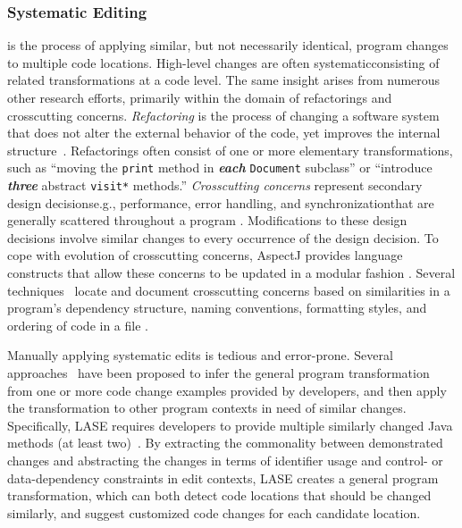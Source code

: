\documentclass[runningheads,a4paper]{llncs}
\newcommand{\codefont}[1]{\footnotesize{\texttt{#1}}\normalsize}
\begin{document}
\subsubsection{Systematic Editing} is the process of applying similar, but not necessarily identical, program changes to multiple code locations. 
High-level changes are often systematic\textemdash consisting of related transformations at a code level. The same insight arises from numerous other research efforts, primarily within the domain of refactorings and crosscutting concerns. {\em Refactoring} is the process of changing a software system that does not alter the external behavior of the code, yet improves the internal structure~\cite{Fowler2000, Griswold1991, Mens2004, Opdyke1992}. Refactorings often consist of one or more elementary transformations, such as ``moving the \codefont{print} method in {\bf \em each} \codefont{Document} subclass'' or ``introduce {\bf \em three} abstract \codefont{visit*} methods.'' {\em Crosscutting concerns} represent secondary design decisions\textemdash e.g., performance, error handling, and synchronization\textemdash that are generally scattered throughout a program \cite{Kiczales1997, Tarr1999}. Modifications to these design decisions involve similar changes to every occurrence of the design decision. To cope with evolution of crosscutting concerns, AspectJ provides language constructs that allow these concerns to be updated in a modular fashion \cite{Kiczales2001}. Several techniques~\cite{Breu2006, Dagenais2007} locate and document crosscutting concerns based on similarities in a program's dependency structure, naming conventions, formatting styles, and ordering of code in a file \cite{Griswold2001}. 

Manually applying systematic edits is tedious and error-prone. 
Several approaches~\cite{MKM2011,MKM2013,Rolim:2017} have been proposed to infer the general program transformation from one or more code change examples provided by developers, and then apply the transformation to other program contexts in need of similar changes. Specifically, LASE requires developers to provide multiple similarly changed Java methods (at least two)~\cite{MKM2013}. By extracting the commonality between demonstrated changes and abstracting the changes in terms of identifier usage and control- or data-dependency constraints in edit contexts, LASE creates a general program transformation, which can both detect code locations that should be changed similarly, and suggest customized code changes for each candidate location.
\end{document}
